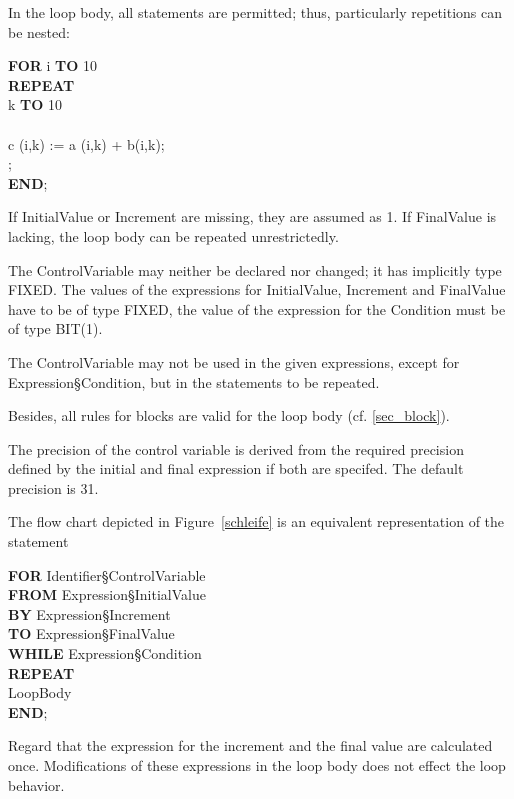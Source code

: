In the loop body, all statements are permitted; thus, particularly
repetitions can be nested:

{\bf FOR} i {\bf TO} 10\\
{\bf REPEAT} \\
 k {\bf TO} 10 \\
 \\
\x \x c (i,k) := a (i,k) + b(i,k);\\
;\\
{\bf END};

If InitialValue or Increment are missing, they are assumed as 1. If FinalValue is lacking, the loop body can be repeated unrestrictedly.

The ControlVariable may neither be declared nor changed; it has
implicitly type FIXED. The values of the expressions for InitialValue,
Increment and FinalValue have to be of type FIXED, the value of the
expression for the Condition must be of type BIT(1).

The ControlVariable may not be used in the given expressions, except
for Expression\S Condition, but in the statements to be repeated.

Besides, all rules for blocks are valid for the loop body (cf. \ref{sec_block}).

The precision of the control variable is derived from the
required precision defined by the initial and final expression if both are
specifed.
The default precision is 31.

The flow chart depicted in Figure~\ref{schleife} is an equivalent representation of the
statement

{\bf FOR} Identifier\S ControlVariable \\
{\bf FROM} Expression\S InitialValue \\
{\bf BY} Expression\S Increment \\
{\bf TO} Expression\S FinalValue \\
{\bf WHILE} Expression\S Condition \\
{\bf REPEAT} \\
\x LoopBody \\
{\bf END};

Regard that the expression for the increment and the final
value are calculated once. Modifications of these expressions
in the loop body does not effect the loop behavior.

